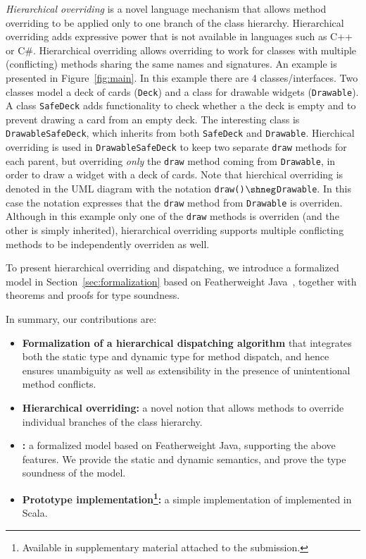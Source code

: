 \textit{Hierarchical overriding} is a novel language
mechanism that allows method overriding to be applied
only to one branch of the class hierarchy. Hierarchical overriding 
adds expressive power that is not available in languages such as 
C++ or C\#. Hierarchical overriding allows overriding to work 
for classes with multiple (conflicting) methods sharing the 
same names and signatures. An example is presented in 
Figure~\ref{fig:main}. In this example there are 4 classes/interfaces.
Two classes model a deck of cards (\lstinline|Deck|) and a class for
drawable widgets (\lstinline|Drawable|). 
A class \lstinline|SafeDeck| adds functionality to check whether a 
the deck is empty and to prevent drawing a card from an empty deck. 
The interesting class is \lstinline|DrawableSafeDeck|, which inherits 
from both \lstinline|SafeDeck| and \lstinline|Drawable|. Hierchical
overriding is used in \lstinline|DrawableSafeDeck| to keep two separate \lstinline|draw|
methods for each parent, but overriding \emph{only} the \lstinline|draw|
method coming from \lstinline|Drawable|, in order to draw a widget
with a deck of cards. Note that hierchical overriding is denoted in the UML
diagram with the notation
\lstinline|draw()|$\shneg$\lstinline|Drawable|. In this case the
notation expresses that the \lstinline|draw| method from \lstinline|Drawable|
is overriden. Although in this example only one of the
\lstinline|draw| methods is overriden (and the other is simply inherited), hierarchical overriding
supports multiple conflicting methods to be independently overriden as well.


To present hierarchical overriding and dispatching, we introduce a
formalized model \MIM{} in Section~\ref{sec:formalization} based on
Featherweight Java~\cite{Igarashi01FJ}, together with theorems and
proofs for type soundness. 


In summary, our contributions are:
\begin{itemize}
	\item \textbf{Formalization of a hierarchical dispatching algorithm} that integrates both the static type and dynamic type for method dispatch, and hence
	ensures unambiguity as well as extensibility in the presence
        of unintentional method conflicts.
	\item \textbf{Hierarchical overriding:} a novel notion that allows
          methods to override individual branches of the class hierarchy.
	\item \textbf{\name:} a formalized model based on
          Featherweight Java, supporting the above features. 
          We provide the static and dynamic semantics, and prove the
          type soundness of the model.
	\item \textbf{Prototype implementation\footnote{Available in
              supplementary material attached to the submission.}:} a
          simple implementation of \MIM{} implemented in Scala.
\end{itemize}

 